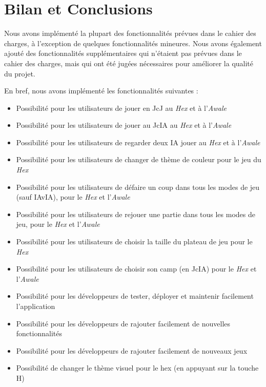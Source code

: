 \section{Bilan et Conclusions}

Nous avons implémenté la plupart des fonctionnalités prévues dans le cahier des charges, à l'exception de quelques
fonctionnalités mineures. Nous avons également ajouté des fonctionnalités supplémentaires qui n'étaient pas prévues
dans le cahier des charges, mais qui ont été jugées nécessaires pour améliorer la qualité du projet.

En bref, nous avons implémenté les fonctionnalités suivantes :

\begin{itemize}
    \item Possibilité pour les utilisateurs de jouer en JcJ au \emph{Hex} et à l'\emph{Awale}
    \item Possibilité pour les utilisateurs de jouer au JcIA au \emph{Hex} et à l'\emph{Awale}
    \item Possibilité pour les utilisateurs de regarder deux IA jouer au \emph{Hex} et à l'\emph{Awale}
    \item Possibilité pour les utilisateurs de changer de thème de couleur pour le jeu du \emph{Hex}
    \item Possibilité pour les utilisateurs de défaire un coup dans tous les modes de jeu (sauf IAvIA), pour le \emph{Hex} et l'\emph{Awale}
    \item Possibilité pour les utilisateurs de rejouer une partie dans tous les modes de jeu, pour le \emph{Hex} et l'\emph{Awale}
    \item Possibilité pour les utilisateurs de choisir la taille du plateau de jeu pour le \emph{Hex}
    \item Possibilité pour les utilisateurs de choisir son camp (en JcIA) pour le \emph{Hex} et l'\emph{Awale}
    \item Possibilité pour les développeurs de tester, déployer et maintenir facilement l'application
    \item Possibilité pour les développeurs de rajouter facilement de nouvelles fonctionnalités
    \item Possibilité pour les développeurs de rajouter facilement de nouveaux jeux
    \item Possibilité de changer le thème visuel pour le hex (en appuyant sur la touche H)
\end{itemize}

